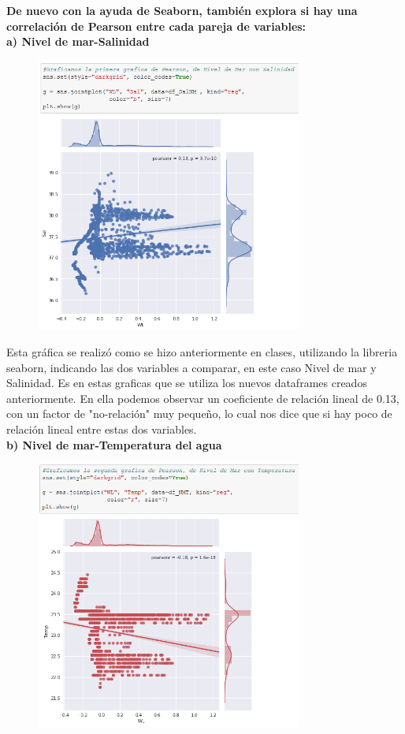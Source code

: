 \documentclass[12pt]{article}
\begin{document}
\noindent\textbf {De nuevo con la ayuda de Seaborn, también explora si hay una correlación de Pearson entre cada pareja de variables: } \\

\noindent\textbf {a) Nivel de mar-Salinidad} \\

\begin{figure}[h]
    \centering
\includegraphics[width=3.45in]{Pearson1.png}
\end{figure}

Esta gráfica se realizó como se hizo anteriormente en clases, utilizando la libreria seaborn, indicando las dos variables a comparar, en este caso Nivel de mar y Salinidad. Es en estas graficas que se utiliza los nuevos dataframes creados anteriormente. En ella podemos observar un coeficiente de relación lineal de 0.13, con un factor de "no-relación" muy pequeño, lo cual nos dice que si hay poco de relación lineal entre estas dos variables. \\ 

\noindent\textbf {b) Nivel de mar-Temperatura del agua} \\
\begin{figure}[h!]
    \centering
\includegraphics[width=3.45in]{Pearson2.png}
\end{figure}
\end{document}
